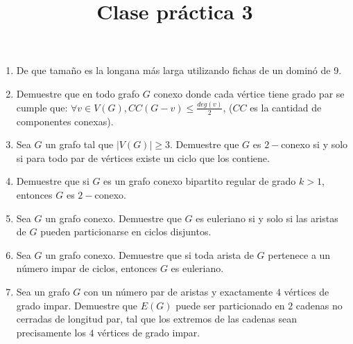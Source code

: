 \documentclass{article}
\begin{document}
\title{Clase pr\'actica 3}
\maketitle

\begin{enumerate}
    \item De que tamaño es la longana más larga utilizando fichas de un dominó de 9.
    \item Demuestre que en todo grafo $G$ conexo donde cada v\'ertice tiene grado par se cumple que: $\forall v \in V(G), CC(G-v) \leq \frac{deg(v)}{2}$, ($CC$ es la cantidad de componentes conexas).
    \item Sea $G$ un grafo tal que $|V(G)| \geq 3$. Demuestre que $G$ es $2-$conexo si y solo si para todo par de v\'ertices existe un ciclo que los contiene.
    \item Demuestre que si $G$ es un grafo conexo bipartito regular de grado $k > 1$, entonces $G$ es $2-$conexo.
    \item Sea $G$ un grafo conexo. Demuestre que $G$ es euleriano si y solo si las aristas de $G$ pueden particionarse en ciclos disjuntos.
    \item Sea $G$ un grafo conexo. Demuestre que si toda arista de $G$ pertenece a un n\'umero impar de ciclos, entonces $G$ es euleriano.
    \item Sea un grafo $G$ con un n\'umero par de aristas y exactamente $4$ v\'ertices de grado impar. Demuestre que $E(G)$ puede ser particionado en $2$ cadenas no cerradas de longitud par, tal que los extremos de las cadenas sean precisamente los $4$ v\'ertices de grado impar. 
 \end{enumerate}
\end{document}

